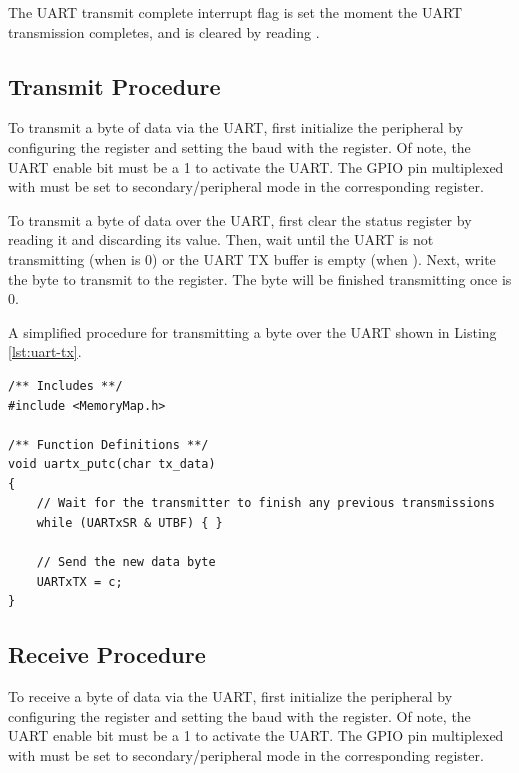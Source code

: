 The UART transmit complete interrupt flag  is set the moment the UART transmission completes, and is cleared by reading .



\subsection{Transmit Procedure}

To transmit a byte of data via the UART, first initialize the  peripheral by configuring the  register and setting the baud with the  register. Of note, the UART enable bit  must be a 1 to activate the UART. The GPIO pin multiplexed with  must be set to secondary/peripheral mode in the corresponding  register.

To transmit a byte of data over the UART, first clear the status register by reading it and discarding its value. Then, wait until the UART is not transmitting (when  is 0) or the UART TX buffer is empty (when ). Next, write the byte to transmit to the  register. The byte will be finished transmitting once  is 0.

A simplified procedure for transmitting a byte over the UART shown in Listing \ref{lst:uart-tx}.

\begin{lstlisting}[style=customC, label=lst:uart-tx, caption={Example Function for UART Transmissions}]
/** Includes **/
#include <MemoryMap.h>

/** Function Definitions **/
void uartx_putc(char tx_data)
{
	// Wait for the transmitter to finish any previous transmissions
	while (UARTxSR & UTBF) { }
	
	// Send the new data byte
	UARTxTX = c;
}
\end{lstlisting}



\subsection{Receive Procedure}

To receive a byte of data via the UART, first initialize the  peripheral by configuring the  register and setting the baud with the  register. Of note, the UART enable bit  must be a 1 to activate the UART. The GPIO pin multiplexed with  must be set to secondary/peripheral mode in the corresponding  register.

